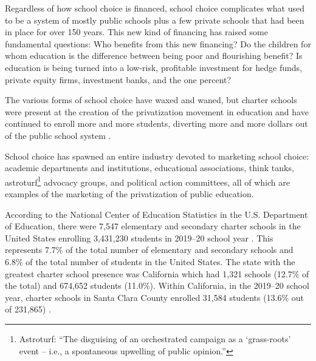 Regardless of how school choice is financed, school choice complicates what used to be a system of mostly public schools plus a few private schools that had been in place for over 150 years. This new kind of financing has raised some fundamental questions: Who benefits from this new financing? Do the children for whom education is the difference between being poor and flourishing benefit? Is education is being turned into a low-risk, profitable investment for hedge funds, private equity firms, investment banks, and the one percent?

The various forms of school choice have waxed and waned, but charter schools were present at the creation of the privatization movement in education and have continued to enroll more and more students, diverting more and more dollars out of the public school system \parencites{Lafer2017a}{Lafer2018}{Lafer.etal2021}.
\begin{comment}
  \parencites[131–132]{Lafer2017a}[18]{Lafer2018}[9]{Lafer.etal2021}
\end{comment}
School choice has spawned an entire industry devoted to marketing school choice: academic departments and institutions, educational associations, think tanks, astroturf\footnote{Astroturf: ``The disguising of an orchestrated campaign as a `grass-roots' event – i.e., a spontaneous upwelling of public opinion.''} advocacy groups, and political action committees, all of which are examples of the marketing of the privatization of public education. %

According to the National Center of Education Statistics in the U.S. Department of Education, there were 7,547 elementary and secondary charter schools in the United States enrolling 3,431,230 students in 2019–20 school year \parencite[Table 216.90, p.144]{DeBrey.etal2022}. This represents 7.7\% of the total number of elementary and secondary schools and 6.8\% of the total number of students in the United States. The state with the greatest charter school presence was California which had 1,321 schools (12.7\% of the total) and 674,652 students (11.0\%). Within California, in the 2019–20 school year, charter schools in Santa Clara County enrolled 31,584 students (13.6\% out of 231,865) \parencite{CDEDataQuest2021}.

